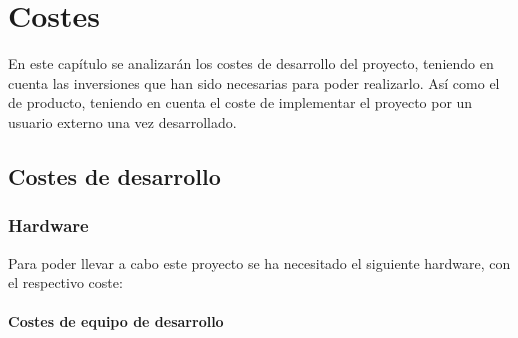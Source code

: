 \chapter{Costes}
En este capítulo se analizarán los costes de desarrollo del proyecto, teniendo
en cuenta las inversiones que han sido necesarias para poder realizarlo. Así
como el de producto, teniendo en cuenta el coste de implementar el
proyecto por un usuario externo una vez desarrollado.

\section{Costes de desarrollo}

\subsection{Hardware}

Para poder llevar a cabo este proyecto se ha necesitado el siguiente hardware, con el respectivo coste:

\subsubsection{Costes de equipo de desarrollo}

